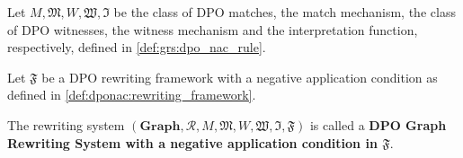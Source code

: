 \documentclass{book}
\begin{document}

    \begin{definition}
      Let $M, \mathfrak{M}, W, \mathfrak{W}, \mathfrak{I}$ be the class of DPO matches, the match mechanism, the class of DPO witnesses, the witness mechanism and the interpretation function, respectively, defined in \autoref{def:grs:dpo_nac_rule}.

      Let $\mathfrak{F}$ be a DPO rewriting framework with a negative application condition as defined in \autoref{def:dponac:rewriting_framework}.

      The rewriting system $(\mathbf{Graph}, \mathcal{R}, M, \mathfrak{M}, W, \mathfrak{W}, \mathfrak{I}, \mathfrak{F})$ is called a \textbf{DPO Graph Rewriting System with a negative application condition in $\mathfrak{F}$}.
    \end{definition}
    
\end{document}
